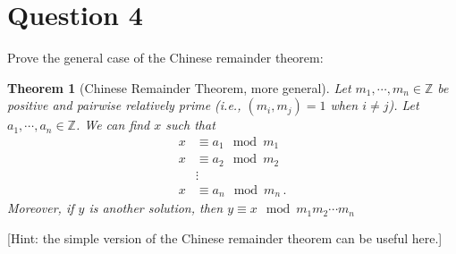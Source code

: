 \documentclass [12pt] {article}
\newtheorem{theorem}{Theorem}
\newcommand{\Z}{\mathbb{Z}}
\begin{document}
\section*{Question 4}
Prove the general case of the Chinese remainder theorem: 

\begin{theorem}[Chinese Remainder Theorem, more general]
    Let $m_1,\cdots,m_n\in\Z$ be positive and pairwise relatively prime (i.e., $(m_i,m_j)=1$ when $i\neq j$). Let $a_1,\cdots,a_n\in \Z$. We can find $x$ such that 
    \begin{align*}
        x &\equiv a_1\mod m_1 \\
        x &\equiv a_2\mod m_2 \\
        &\vdots \\
        x &\equiv a_n\mod m_n\,.
    \end{align*}
    Moreover, if $y$ is another solution, then $y\equiv x\mod m_1m_2\cdots m_n$
\end{theorem}
[Hint: the simple version of the Chinese remainder theorem can be useful here.]
\end{document}
